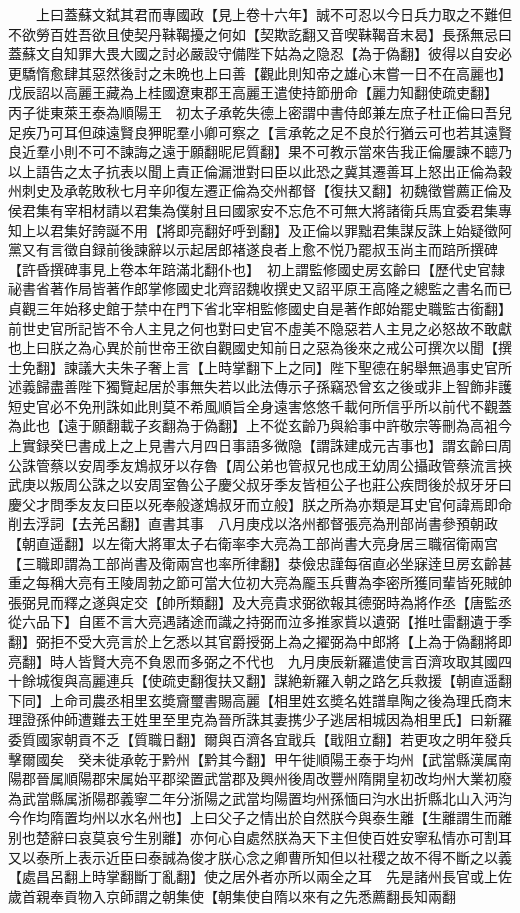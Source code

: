 　　上曰蓋蘇文弑其君而專國政【見上卷十六年】誠不可忍以今日兵力取之不難但不欲勞百姓吾欲且使契丹靺鞨擾之何如【契欺訖翻又音喫靺鞨音末曷】長孫無忌曰蓋蘇文自知罪大畏大國之討必嚴設守備陛下姑為之隐忍【為于偽翻】彼得以自安必更驕惰愈肆其惡然後討之未晩也上曰善【觀此則知帝之雄心末嘗一日不在高麗也】戊辰詔以高麗王藏為上桂國遼東郡王高麗王遣使持節册命【麗力知翻使疏吏翻】　丙子徙東萊王泰為順陽王　初太子承乾失德上密謂中書侍郎兼左庶子杜正倫曰吾兒足疾乃可耳但疎遠賢良狎昵羣小卿可察之【言承乾之足不良於行猶云可也若其遠賢良近羣小則不可不諫誨之遠于願翻昵尼質翻】果不可教示當來告我正倫屢諫不聼乃以上語告之太子抗表以聞上責正倫漏泄對曰臣以此恐之冀其遷善耳上怒出正倫為穀州刺史及承乾敗秋七月辛卯復左遷正倫為交州都督【復扶又翻】初魏徵嘗薦正倫及侯君集有宰相材請以君集為僕射且曰國家安不忘危不可無大將諸衛兵馬宜委君集專知上以君集好誇誕不用【將即亮翻好呼到翻】及正倫以罪黜君集謀反誅上始疑徵阿黨又有言徵自録前後諫辭以示起居郎褚遂良者上愈不悦乃罷叔玉尚主而踣所撰碑【許昏撰碑事見上卷本年踣滿北翻仆也】　初上謂監修國史房玄齡曰【歷代史官隸祕書省著作局皆著作郎掌修國史北齊詔魏收撰史又詔平原王高隆之總監之書名而已貞觀三年始移史館于禁中在門下省北宰相監修國史自是著作郎始罷史職監古銜翻】前世史官所記皆不令人主見之何也對曰史官不虛美不隐惡若人主見之必怒故不敢獻也上曰朕之為心異於前世帝王欲自觀國史知前日之惡為後來之戒公可撰次以聞【撰士免翻】諫議大夫朱子奢上言【上時掌翻下上之同】陛下聖德在躬舉無過事史官所述義歸盡善陛下獨覽起居於事無失若以此法傳示子孫竊恐曾玄之後或非上智飾非護短史官必不免刑誅如此則莫不希風順旨全身遠害悠悠千載何所信乎所以前代不觀蓋為此也【遠于願翻載子亥翻為于偽翻】上不從玄齡乃與給事中許敬宗等刪為高袓今上實録癸巳書成上之上見書六月四日事語多微隐【謂誅建成元吉事也】謂玄齡曰周公誅管蔡以安周季友鴆叔牙以存魯【周公弟也管叔兄也成王幼周公攝政管蔡流言挾武庚以叛周公誅之以安周室魯公子慶父叔牙季友皆桓公子也莊公疾問後於叔牙牙曰慶父才問季友友曰臣以死奉般遂鴆叔牙而立般】朕之所為亦類是耳史官何諱焉即命削去浮詞【去羌呂翻】直書其事　八月庚戍以洛州都督張亮為刑部尚書參預朝政【朝直遥翻】以左衛大將軍太子右衛率李大亮為工部尚書大亮身居三職宿衛兩宫【三職即謂為工部尚書及衛兩宫也率所律翻】㳟儉忠謹每宿直必坐寐逹旦房玄齡甚重之每稱大亮有王陵周勃之節可當大位初大亮為龎玉兵曹為李密所獲同輩皆死賊帥張弼見而釋之遂與定交【帥所類翻】及大亮貴求弼欲報其德弼時為將作丞【唐監丞從六品下】自匿不言大亮遇諸途而識之持弼而泣多推家貲以遺弼【推吐雷翻遺于季翻】弼拒不受大亮言於上乞悉以其官爵授弼上為之擢弼為中郎將【上為于偽翻將即亮翻】時人皆賢大亮不負恩而多弼之不代也　九月庚辰新羅遣使言百濟攻取其國四十餘城復與高麗連兵【使疏吏翻復扶又翻】謀絶新羅入朝之路乞兵救援【朝直遥翻下同】上命司農丞相里玄奬齎璽書賜高麗【相里姓玄奬名姓譜臯陶之後為理氏商末理證孫仲師遭難去王姓里至里克為晉所誅其妻携少子逃居相城因為相里氏】曰新羅委質國家朝貢不乏【質職日翻】爾與百濟各宜戢兵【戢阻立翻】若更攻之明年發兵擊爾國矣　癸未徙承乾于黔州【黔其今翻】甲午徙順陽王泰于均州【武當縣漢属南陽郡晉属順陽郡宋属始平郡梁置武當郡及興州後周改豐州隋開皇初改均州大業初廢為武當縣属浙陽郡義寧二年分浙陽之武當均陽置均州孫愐曰汮水出折縣北山入沔汮今作均隋置均州以水名州也】上曰父子之情出於自然朕今與泰生離【生離謂生而離别也楚辭曰哀莫哀兮生别離】亦何心自處然朕為天下主但使百姓安寧私情亦可割耳又以泰所上表示近臣曰泰誠為俊才朕心念之卿曹所知但以社稷之故不得不斷之以義【處昌呂翻上時掌翻斷丁亂翻】使之居外者亦所以兩全之耳　先是諸州長官或上佐歲首親奉貢物入京師謂之朝集使【朝集使自隋以來有之先悉薦翻長知兩翻
